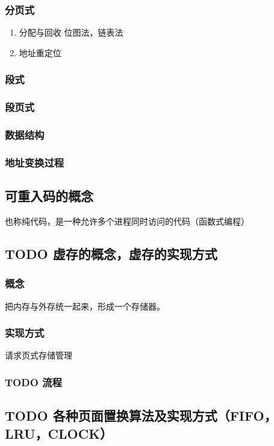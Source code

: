 \documentclass[11pt]{article}
\begin{document}
\subsubsection{分页式}
\label{sec-3-3-1}
\begin{enumerate}
\item 分配与回收
\label{sec-3-3-1-1}
位图法，链表法
\item 地址重定位
\label{sec-3-3-1-2}
\end{enumerate}

\subsubsection{段式}
\label{sec-3-3-2}
\subsubsection{段页式}
\label{sec-3-3-3}
\subsubsection{数据结构}
\label{sec-3-3-4}
\subsubsection{地址变换过程}
\label{sec-3-3-5}
\subsection{可重入码的概念}
\label{sec-3-4}
也称纯代码，是一种允许多个进程同时访问的代码（函数式编程）
\subsection{{\bfseries\sffamily TODO} 虚存的概念，虚存的实现方式}
\label{sec-3-5}
\subsubsection{概念}
\label{sec-3-5-1}
把内存与外存统一起来，形成一个存储器。
\subsubsection{实现方式}
\label{sec-3-5-2}
请求页式存储管理
\subsubsection{{\bfseries\sffamily TODO} 流程}
\label{sec-3-5-3}
\subsection{{\bfseries\sffamily TODO} 各种页面置换算法及实现方式（FIFO，LRU，CLOCK）}
\label{sec-3-6}
\end{document}
